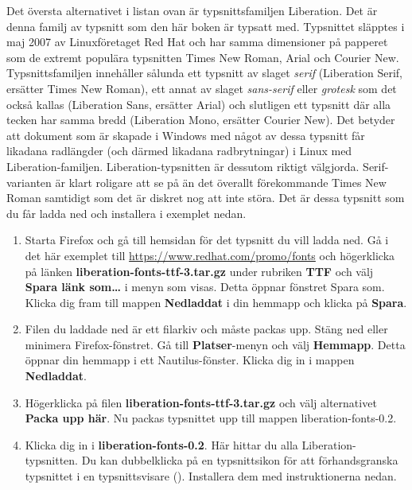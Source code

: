 \documentclass[a4paper,final]{memoir} %
\begin{document}
Det översta alternativet i listan ovan är typsnittsfamiljen Liberation. Det är denna familj av typsnitt som den här boken är typsatt med. Typsnittet släpptes i maj 2007 av Linuxföretaget Red Hat och har samma dimensioner på papperet som de extremt populära typsnitten Times New Roman, Arial och Courier New. Typsnittsfamiljen innehåller sålunda ett typsnitt av slaget \textit{serif} (Liberation Serif, ersätter Times New Roman), ett annat av slaget \textit{sans-serif} eller \textit{grotesk} som det också kallas (Liberation Sans, ersätter Arial) och slutligen ett typsnitt där alla tecken har samma bredd (Liberation Mono, ersätter Courier New). Det betyder att dokument som är skapade i Windows med något av dessa typsnitt får likadana radlängder (och därmed likadana radbrytningar) i Linux med Liberation-familjen. Liberation-typsnitten är dessutom riktigt välgjorda. Serif-varianten är klart roligare att se på än det överallt förekommande Times New Roman samtidigt som det är diskret nog att inte störa. Det är dessa typsnitt som du får ladda ned och installera i exemplet nedan. 

\begin{enumerate}

\item Starta Firefox och gå till hemsidan för det typsnitt du vill ladda ned. Gå i det här exemplet till \url{https://www.redhat.com/promo/fonts} och högerklicka på länken \textbf{liberation-fonts-ttf-3.tar.gz} under rubriken \textbf{TTF} och välj \textbf{Spara länk som\ldots{}} i menyn som visas. Detta öppnar fönstret Spara som. Klicka dig fram till mappen \textbf{Nedladdat} i din hemmapp och klicka på \textbf{Spara}.

\item Filen du laddade ned är ett filarkiv och måste packas upp. Stäng ned eller minimera Firefox-fönstret. Gå till \textbf{Platser}-menyn och välj \textbf{Hemmapp}. Detta öppnar din hemmapp i ett Nautilus-fönster. Klicka dig in i mappen \textbf{Nedladdat}. 

\item Högerklicka på filen \textbf{liberation-fonts-ttf-3.tar.gz} och välj alternativet \textbf{Packa upp här}. Nu packas typsnittet upp till mappen liberation-fonts-0.2. 

\item Klicka dig in i \textbf{liberation-fonts-0.2}. Här hittar du alla Liberation-typsnitten. Du kan dubbelklicka på en typsnittsikon för att förhandsgranska typsnittet i en typsnittsvisare (). Installera dem med instruktionerna nedan.

\end{enumerate}
\end{document}

